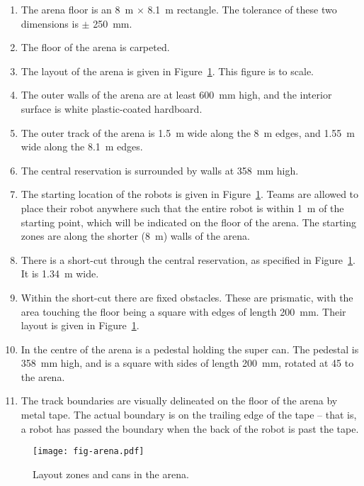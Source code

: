 \begin{enumerate}
  \item The arena floor is an \SI{8}{m} $\times$ \SI{8.1}{m} rectangle. The
        tolerance of these two dimensions is $\pm$ \SI{250}{mm}.
  \item The floor of the arena is carpeted.
  \item The layout of the arena is given in Figure~\ref{fig:arena}. This
        figure is to scale.
  \item The outer walls of the arena are at least \SI{600}{mm} high, and the
        interior surface is white plastic-coated hardboard.
  \item The outer track of the arena is \SI{1.5}{m} wide along the \SI{8}{m}
        edges, and \SI{1.55}{m} wide along the \SI{8.1}{m} edges.
  \item The central reservation is surrounded by walls at \SI{358}{mm} high.
  \item The starting location of the robots is given in Figure~\ref{fig:arena}.
        Teams are allowed to place their robot anywhere such that the entire
        robot is within \SI{1}{m} of the starting point, which will be
        indicated on the floor of the arena. The starting zones are along the
        shorter (\SI{8}{m}) walls of the arena.
  \item There is a short-cut through the central reservation, as specified in
        Figure~\ref{fig:arena}. It is \SI{1.34}{m} wide.
  \item Within the short-cut there are fixed obstacles. These are prismatic,
        with the area touching the floor being a square with edges of length
        \SI{200}{mm}. Their layout is given in Figure~\ref{fig:arena}.
  \item In the centre of the arena is a pedestal holding the super can. The
        pedestal is \SI{358}{mm} high, and is a square with sides of length
        \SI{200}{mm}, rotated at 45\degree{} to the arena.
  \item The track boundaries are visually delineated on the floor of the arena
        by metal tape. The actual boundary is on the trailing edge of the tape
        -- that is, a robot has passed the boundary when the back of the robot
        is past the tape.
\end{enumerate}

\begin{figure}
  \texttt{[image: fig-arena.pdf]}
  \caption{Layout zones and cans in the arena.}
  \label{fig:arena}
\end{figure}

